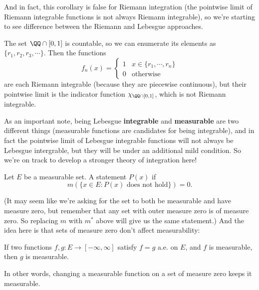 And in fact, this corollary is false for Riemann integration (the pointwise limit of Riemann integrable functions is not always Riemann integrable), so we're starting to see difference between the Riemann and Lebesgue approaches.

\begin{example}
The set $\QQ \cap [0, 1]$ is countable, so we can enumerate its elements as $\{r_1, r_2, r_3, \cdots\}$. Then the functions 
\[
    f_n(x) = \begin{cases} 1 & x \in \{r_1, \cdots, r_n\} \\ 0 & \text{otherwise}\end{cases}
\]
are each Riemann integrable (because they are piecewise continuous), but their pointwise limit is the indicator function $\chi_{\QQ \cap [0, 1]}$, which is not Riemann integrable.
\end{example}

As an important note, being Lebesgue \textbf{integrable} and \textbf{measurable} are two different things (measurable functions are candidates for being integrable), and in fact the pointwise limit of Lebesgue integrable functions will not always be Lebesgue intergrable, but they will be under an additional mild condition. So we're on track to develop a stronger theory of integration here!

\begin{definition}
Let $E$ be a measurable set. A statement $P(x)$  if 
\[
    m\left(\{x \in E: P(x) \text{ does not hold}\}\right) = 0.
\]
\end{definition}

(It may seem like we're asking for the set to both be measurable and have measure zero, but remember that any set with outer measure zero is of measure zero. So replacing $m$ with $m^\ast$ above will give us the same statement.) And the idea here is that sets of measure zero don't affect measurability:

\begin{theorem}
If two functions $f, g: E \to [-\infty, \infty]$ satisfy $f = g$ a.e. on $E$, and $f$ is measurable, then $g$ is measurable.
\end{theorem}

In other words, changing a measurable function on a set of measure zero keeps it measurable.

